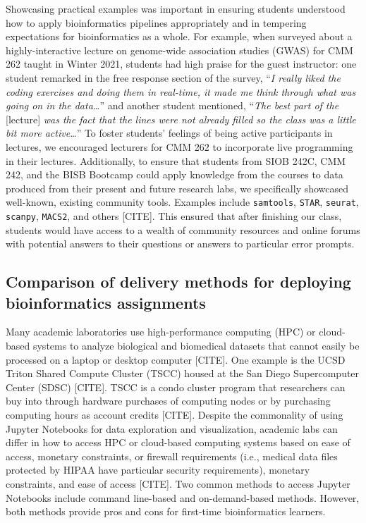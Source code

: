 Showcasing practical examples was important in ensuring students understood how to apply bioinformatics pipelines appropriately and in tempering expectations for bioinformatics as a whole. For example, when surveyed about a highly-interactive lecture on genome-wide association studies (GWAS) for CMM 262 taught in Winter 2021, students had high praise for the guest instructor: one student remarked in the free response section of the survey, “\textit{I really liked the coding exercises and doing them in real-time, it made me think through what was going on in the data…}” and another student mentioned, “\textit{The best part of the} [lecture] \textit{was the fact that the lines were not already filled so the class was a little bit more active…}” To foster students’ feelings of being active participants in lectures, we encouraged lecturers for CMM 262 to incorporate live programming in their lectures. Additionally, to ensure that students from SIOB 242C, CMM 242, and the BISB Bootcamp could apply knowledge from the courses to data produced from their present and future research labs, we specifically showcased well-known, existing community tools. Examples include \verb|samtools|, \verb|STAR|, \verb|seurat|, \verb|scanpy|, \verb|MACS2|, and others [CITE]. This ensured that after finishing our class, students would have access to a wealth of community resources and online forums with potential answers to their questions or answers to particular error prompts.

\subsection{Comparison of delivery methods for deploying bioinformatics assignments}

Many academic laboratories use high-performance computing (HPC) or cloud-based systems to analyze biological and biomedical datasets that cannot easily be processed on a laptop or desktop computer [CITE]. One example is the UCSD Triton Shared Compute Cluster (TSCC) housed at the San Diego Supercomputer Center (SDSC) [CITE]. TSCC is a condo cluster program that researchers can buy into through hardware purchases of computing nodes or by purchasing computing hours as account credits [CITE]. Despite the commonality of using Jupyter Notebooks for data exploration and visualization, academic labs can differ in how to access HPC or cloud-based computing systems based on ease of access, monetary constraints, or firewall requirements (i.e., medical data files protected by HIPAA have particular security requirements), monetary constraints, and ease of access [CITE]. Two common methods to access Jupyter Notebooks include command line-based and on-demand-based methods. However, both methods provide pros and cons for first-time bioinformatics learners. 

